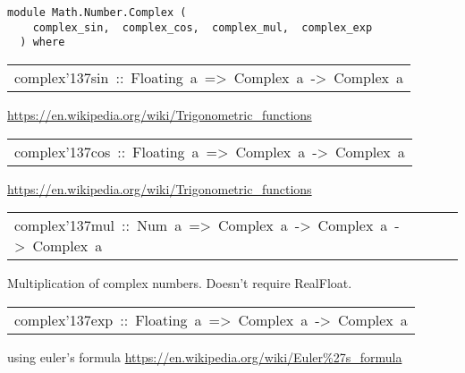 \label{module:Math.Number.Complex}
\haddockbeginheader
{\haddockverb\begin{verbatim}
module Math.Number.Complex (
    complex_sin,  complex_cos,  complex_mul,  complex_exp
  ) where\end{verbatim}}
\haddockendheader

\begin{haddockdesc}
\item[\begin{tabular}{@{}l}
complex{\char '137}sin\ ::\ Floating\ a\ =>\ Complex\ a\ ->\ Complex\ a
\end{tabular}]\haddockbegindoc
\url{https://en.wikipedia.org/wiki/Trigonometric_functions}\par

\end{haddockdesc}
\begin{haddockdesc}
\item[\begin{tabular}{@{}l}
complex{\char '137}cos\ ::\ Floating\ a\ =>\ Complex\ a\ ->\ Complex\ a
\end{tabular}]\haddockbegindoc
\url{https://en.wikipedia.org/wiki/Trigonometric_functions}\par

\end{haddockdesc}
\begin{haddockdesc}
\item[\begin{tabular}{@{}l}
complex{\char '137}mul\ ::\ Num\ a\ =>\ Complex\ a\ ->\ Complex\ a\ ->\ Complex\ a
\end{tabular}]\haddockbegindoc
Multiplication of complex numbers. Doesn't require RealFloat.\par

\end{haddockdesc}
\begin{haddockdesc}
\item[\begin{tabular}{@{}l}
complex{\char '137}exp\ ::\ Floating\ a\ =>\ Complex\ a\ ->\ Complex\ a
\end{tabular}]\haddockbegindoc
using euler's formula \url{https://en.wikipedia.org/wiki/Euler%27s_formula}\par

\end{haddockdesc}